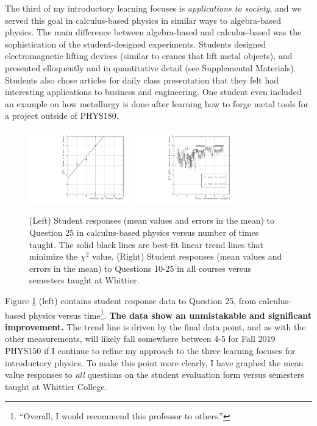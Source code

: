 \documentclass[../../main.tex]{subfiles}
\begin{document}
The third of my introductory learning focuses is \textit{applications to society}, and we served this goal in calculus-based physics in similar ways to algebra-based physics.  The main difference between algebra-based and calculus-based was the sophistication of the student-designed experiments.  Students designed electromagnetic lifting devices (similar to cranes that lift metal objects), and presented elloquently and in quantitative detail (see Supplemental Materials).  Students also chose articles for daily class presentation that they felt had interesting applications to business and engineering.  One student even included an example on how metallurgy is done after learning how to forge metal tools for a project outside of PHYS180. \\ \hspace{0.1cm}

\begin{figure}
\centering
\includegraphics[width=0.4\textwidth]{Q25_calculus_based.pdf}
\includegraphics[width=0.4\textwidth]{Q10_Q25_all_courses_vs_time.pdf}
\caption{\label{fig:courses:intro_q25_2}  (Left) Student responses (mean values and errors in the mean) to Question 25 in calculus-based physics versus number of times taught.  The solid black lines are best-fit linear trend lines that minimize the $\chi^2$ value. (Right) Student responses (mean values and errors in the mean) to Questions 10-25 in all courses versus semesters taught at Whittier.}
\end{figure}

Figure \ref{fig:courses:intro_q25_2} (left) contains student response data to Question 25, from calculus-based physics versus time\footnote{``Overall, I would recommend this professor to others.''}.  \textbf{The data show an unmistakable and significant improvement.}  The trend line is driven by the final data point, and as with the other measurements, will likely fall somewhere between 4-5 for Fall 2019 PHYS150 if I continue to refine my approach to the three learning focuses for introductory physics.  To make this point more clearly, I have graphed the mean value responses to \textit{all} questions on the student evaluation form versus semesters taught at Whittier College.  \\ \hspace{0.1cm}
\end{document}
